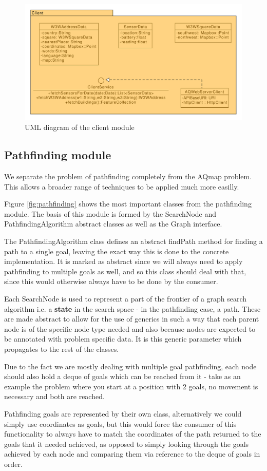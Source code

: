 \documentclass[10pt,a4paper]{article}
\begin{document}
\begin{figure}[h]
    \centering
    \includegraphics[width=0.7\columnwidth]{diagrams/client.uxf.pdf}
    \caption{UML diagram of the client module}
    \label{fig:client}
\end{figure}

\subsection{Pathfinding module}
We separate the problem of pathfinding completely from the AQmap problem. This allows a broader range of techniques to be applied much more easilly.
\par 
\medskip
Figure \ref{fig:pathfinding} shows the most important classes from the pathfinding module. 
The basis of this module is formed by the SearchNode and PathfindingAlgorithm abstract classes as well as the Graph interface.
\par
The PathfindingAlgorithm class defines an abstract findPath method for finding a path to a single goal, leaving the exact way this is done to the concrete implementation. 
It is marked as abstract since we will always need to apply pathfinding to multiple goals as well, and so this class should deal with that, since this would otherwise always have to be done by the consumer.
\par
Each SearchNode is used to represent a part of the frontier of a graph search algorithm i.e. a \textbf{state} in the search space - in the pathfinding case, a path. 
These are made abstract to allow for the use of generics in such a way that each parent node is of the specific node type needed and also because nodes are expected to be annotated with problem specific data.
It is this generic parameter which propagates to the rest of the classes.
\par
Due to the fact we are mostly dealing with multiple goal pathfinding, each node should also hold a deque of goals which can be reached from it - take as an example the problem where you start at a position with 2 goals, no movement is necessary and both are reached.
\par
Pathfinding goals are represented by their own class, alternatively we could simply use coordinates as goals, 
but this would force the consumer of this functionality to always have to match the coordinates of the path returned to the goals that it needed achieved,
as opposed to simply looking through the goals achieved by each node and comparing them via reference to the deque of goals in order.
\end{document}
